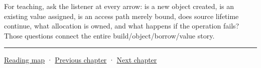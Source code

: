 For teaching, ask the listener at every arrow: is a new object created, is an existing value assigned, is an access path merely bound, does source lifetime continue, what allocation is owned, and what happens if the operation fails? Those questions connect the entire build/object/borrow/value story.

\begin{center}\rule{0.5\linewidth}{0.5pt}\end{center}

\hyperref[volume-reading-map]{Reading map} · \hyperref[01-foundations-i-ch002-values-at-addresses-layout-lifetimes-and-representation]{Previous chapter} · \hyperref[01-foundations-i-ch004-prove-c-ownership-with-runnable-experiments]{Next chapter}
